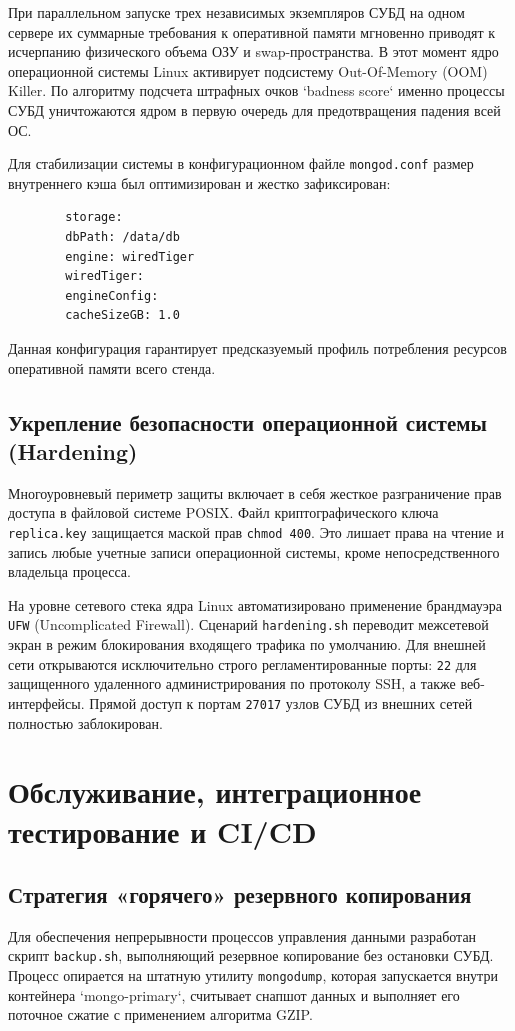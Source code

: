 \documentclass[a4paper,14pt]{extarticle}
\begin{document}
	При параллельном запуске трех независимых экземпляров СУБД на одном сервере их суммарные требования к оперативной памяти мгновенно приводят к исчерпанию физического объема ОЗУ и swap-пространства. В этот момент ядро операционной системы Linux активирует подсистему Out-Of-Memory (OOM) Killer. По алгоритму подсчета штрафных очков `badness score` именно процессы СУБД уничтожаются ядром в первую очередь для предотвращения падения всей ОС.
	
	Для стабилизации системы в конфигурационном файле \texttt{mongod.conf} размер внутреннего кэша был оптимизирован и жестко зафиксирован:
	\begin{lstlisting}
		storage:
		dbPath: /data/db
		engine: wiredTiger
		wiredTiger:
		engineConfig:
		cacheSizeGB: 1.0
	\end{lstlisting}
	Данная конфигурация гарантирует предсказуемый профиль потребления ресурсов оперативной памяти всего стенда.
	
	\subsection{Укрепление безопасности операционной системы (Hardening)}
	Многоуровневый периметр защиты включает в себя жесткое разграничение прав доступа в файловой системе POSIX. Файл криптографического ключа \texttt{replica.key} защищается маской прав \texttt{chmod 400}. Это лишает права на чтение и запись любые учетные записи операционной системы, кроме непосредственного владельца процесса.
	
	На уровне сетевого стека ядра Linux автоматизировано применение брандмауэра \texttt{UFW} (Uncomplicated Firewall). Сценарий \texttt{hardening.sh} переводит межсетевой экран в режим блокирования входящего трафика по умолчанию. Для внешней сети открываются исключительно строго регламентированные порты: \texttt{22} для защищенного удаленного администрирования по протоколу SSH, а также веб-интерфейсы. Прямой доступ к портам \texttt{27017} узлов СУБД из внешних сетей полностью заблокирован.
	
	\newpage
	
	\section{Обслуживание, интеграционное тестирование и CI/CD}
	
	\subsection{Стратегия «горячего» резервного копирования}
	Для обеспечения непрерывности процессов управления данными разработан скрипт \texttt{backup.sh}, выполняющий резервное копирование без остановки СУБД. Процесс опирается на штатную утилиту \texttt{mongodump}, которая запускается внутри контейнера `mongo-primary`, считывает снапшот данных и выполняет его поточное сжатие с применением алгоритма GZIP. 
	
\end{document}
